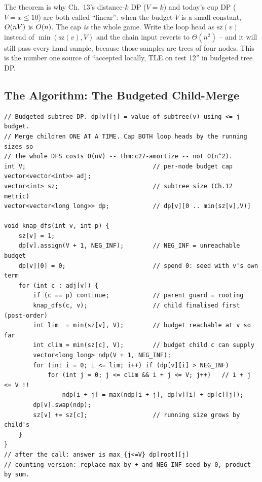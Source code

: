 \begin{insightbox}
The theorem is why Ch.~13's distance-$k$ DP ($V = k$) and today's cup DP
($V = x \le 10$) are both called ``linear'': when the budget $V$ is a small
constant, $O(nV)$ is $O(n)$. The cap \emph{is} the whole game. Write
the loop head as $\text{sz}(v)$ instead of $\min(\text{sz}(v), V)$ and the
chain input reverts to $\Theta(n^2)$ -- and it will still pass every hand
sample, because those samples are trees of four nodes. This is the number one
source of ``accepted locally, TLE on test 12'' in budgeted tree DP.
\end{insightbox}

\subsection{The Algorithm: The Budgeted Child-Merge}

\begin{lstlisting}[caption={The generic budgeted child-merge: same DFS as \coderef{c10-fold}, but the state is an array and children fold by capped convolution}, label={lst:c27-knap}]
// Budgeted subtree DP. dp[v][j] = value of subtree(v) using <= j budget.
// Merge children ONE AT A TIME. Cap BOTH loop heads by the running sizes so
// the whole DFS costs O(nV) -- thm:c27-amortize -- not O(n^2).
int V;                                   // per-node budget cap
vector<vector<int>> adj;
vector<int> sz;                          // subtree size (Ch.12 metric)
vector<vector<long long>> dp;            // dp[v][0 .. min(sz[v],V)]

void knap_dfs(int v, int p) {
    sz[v] = 1;
    dp[v].assign(V + 1, NEG_INF);        // NEG_INF = unreachable budget
    dp[v][0] = 0;                        // spend 0: seed with v's own term
    for (int c : adj[v]) {
        if (c == p) continue;            // parent guard = rooting
        knap_dfs(c, v);                  // child finalised first (post-order)
        int lim  = min(sz[v], V);        // budget reachable at v so far
        int clim = min(sz[c], V);        // budget child c can supply
        vector<long long> ndp(V + 1, NEG_INF);
        for (int i = 0; i <= lim; i++) if (dp[v][i] > NEG_INF)
            for (int j = 0; j <= clim && i + j <= V; j++)   // i + j <= V !!
                ndp[i + j] = max(ndp[i + j], dp[v][i] + dp[c][j]);
        dp[v].swap(ndp);
        sz[v] += sz[c];                  // running size grows by child's
    }
}
// after the call: answer is max_{j<=V} dp[root][j]
// counting version: replace max by + and NEG_INF seed by 0, product by sum.
\end{lstlisting}

